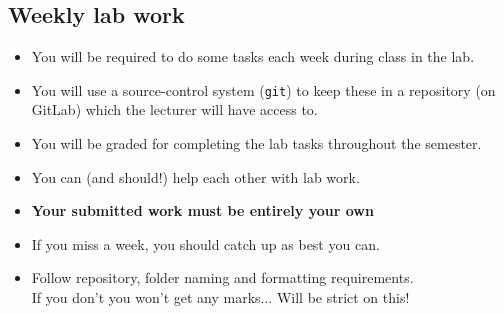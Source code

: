 \documentclass[slides]{pgnotes}
\begin{document}
\vspace{\fill}


\subsection{Weekly lab work}

\begin{itemize}

\item
  You will be required to do some tasks each week during class in the lab.

\item
  You will use a source-control system (\texttt{git}) to keep these in a repository (on GitLab) which the lecturer will have access to.
  
\item
  You will be graded for completing the lab tasks throughout the semester. 

\item
  You can (and should!) help each other with lab work.

\item 
  \textbf{Your submitted work must be entirely your own}
  
\item
  If you miss a week, you should catch up as best you can.

\item
  Follow repository, folder naming and formatting requirements.\\
  If you don't you won't get any marks... Will be strict on this!
  
\end{itemize}
\end{document}
